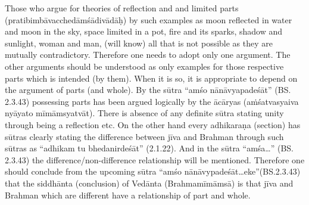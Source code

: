 Those who argue for theories of reflection and and limited parts (pratibimbāvacchedāmśādivādāḥ) by such examples as moon reflected in water and moon in the sky, space limited in a pot, fire and its sparks, shadow and sunlight, woman and man, (will know) all that is not possible as they are mutually contradictory. Therefore one needs to adopt only one argument. The other arguments should be understood as only examples for those respective parts which is intended (by them). When it is so, it is appropriate to depend on the argument of parts (and whole).  By the sūtra “amśo nānāvyapadeśāt” (BS. 2.3.43) possessing parts has been argued logically by the ācāryas (aṁśatvasyaiva nyāyato mīmāmsyatvāt). There is absence of any definite sūtra stating unity through being a reflection etc. On the other hand every adhikaraṇa (section) has sūtras clearly stating the difference between jīva and Brahman through such sūtras as “adhikam tu bhedanirdeśāt” (2.1.22). And in the sūtra “amśa…” (BS. 2.3.43) the difference/non-difference relationship will be  mentioned. Therefore one should conclude from the upcoming sūtra “amśo nānāvypadeśāt…eke”(BS.2.3.43) that the siddhānta (conclusion) of Vedānta (Brahmamīmāmsā) is that jīva and Brahman which are different have a relationship of part and whole.



